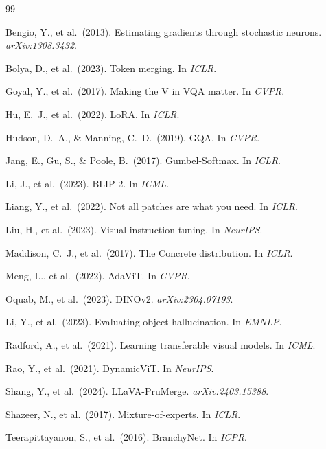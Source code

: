 \documentclass[11pt,a4paper]{article}
\begin{document}
\begin{thebibliography}{99}

Bengio, Y., et al.\ (2013). Estimating gradients through stochastic neurons.
\emph{arXiv:1308.3432}.

Bolya, D., et al.\ (2023). Token merging. In \emph{ICLR}.

Goyal, Y., et al.\ (2017). Making the V in VQA matter. In \emph{CVPR}.

Hu, E.~J., et al.\ (2022). LoRA. In \emph{ICLR}.

Hudson, D.~A., \& Manning, C.~D.\ (2019). GQA. In \emph{CVPR}.

Jang, E., Gu, S., \& Poole, B.\ (2017). Gumbel-Softmax. In \emph{ICLR}.

Li, J., et al.\ (2023). BLIP-2. In \emph{ICML}.

Liang, Y., et al.\ (2022). Not all patches are what you need. In \emph{ICLR}.

Liu, H., et al.\ (2023). Visual instruction tuning. In \emph{NeurIPS}.

Maddison, C.~J., et al.\ (2017). The Concrete distribution. In \emph{ICLR}.

Meng, L., et al.\ (2022). AdaViT. In \emph{CVPR}.

Oquab, M., et al.\ (2023). DINOv2. \emph{arXiv:2304.07193}.

Li, Y., et al.\ (2023). Evaluating object hallucination. In \emph{EMNLP}.

Radford, A., et al.\ (2021). Learning transferable visual models. In \emph{ICML}.

Rao, Y., et al.\ (2021). DynamicViT. In \emph{NeurIPS}.

Shang, Y., et al.\ (2024). LLaVA-PruMerge. \emph{arXiv:2403.15388}.

Shazeer, N., et al.\ (2017). Mixture-of-experts. In \emph{ICLR}.

Teerapittayanon, S., et al.\ (2016). BranchyNet. In \emph{ICPR}.

\end{thebibliography}
\end{document}
